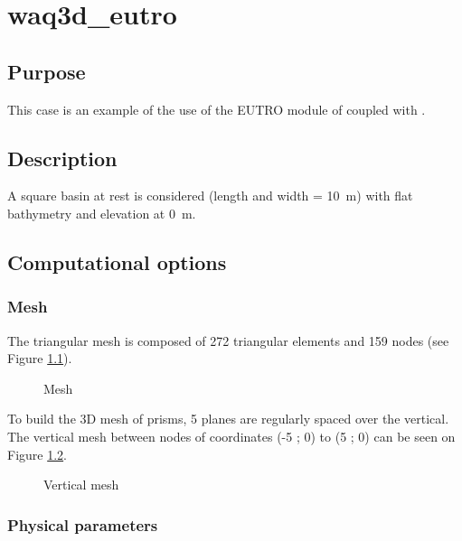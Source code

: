 \chapter{waq3d\_eutro}

\section{Purpose}

This case is an example of the use of the EUTRO module of \waqtel coupled with
.

\section{Description}

A square basin at rest is considered (length and width = 10~m)
with flat bathymetry and elevation at 0~m.

\section{Computational options}

\subsection{Mesh}

The triangular mesh is composed of 272 triangular elements and 159 nodes
(see Figure \ref{fig:waq3d_eutro:mesh}).

\begin{figure}[H]
 \centering
\caption{Mesh}
 \label{fig:waq3d_eutro:mesh}
\end{figure}

To build the 3D mesh of prisms, 5 planes are regularly spaced over the vertical.
The vertical mesh between nodes of coordinates (-5 ; 0) to (5 ; 0) can be
seen on Figure \ref{fig:waq3d_eutro:mesh_section}.

\begin{figure}[H]
 \centering
\caption{Vertical mesh}
 \label{fig:waq3d_eutro:mesh_section}
\end{figure}

\subsection{Physical parameters}

